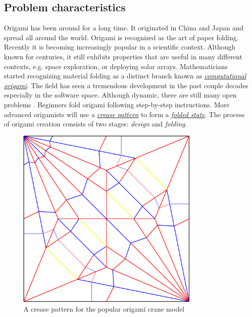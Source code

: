 \subsection{Problem characteristics}
Origami has been around for a long time. It originated in China and Japan and
spread all around the world\cite{wiki:history-of-origami}. Origami is
recognized as the art of paper folding.
Recently it is becoming increasingly popular in a scientific context.
Although known for centuries, it still exhibits properties that are useful
in many different contexts, e.g.
space exploration\cite{origami-in-orbit}, or deploying solar arrays\cite{solar-panel-origami}.
Mathematicians started recognizing material folding as a distinct
branch known as \hyperref[dictionary:computational-origami]{\textit{computational origami}}.
The field has seen a tremendous development in the past couple decades especially in the software space.
Although dynamic, there are still many open problems \cite{mit-open-problems}.
Beginners fold origami following step-by-step instructions.
More advanced origamists will use a \hyperref[dictionary:crease-pattern]{\textit{crease pattern}}
to form a \hyperref[dictionary:folded-state]{\textit{folded state}}.
The process of origami creation consists of two stages: \textit{design} and \textit{folding}.

\begin{figure}[H]
\caption{A crease pattern for the popular origami crane model}
  \centering
    \includegraphics[width=0.8\textwidth]{assets/crane-crease-pattern.png}
\end{figure}

